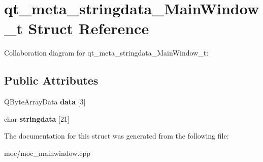 \hypertarget{structqt__meta__stringdata___main_window__t}{\section{qt\-\_\-meta\-\_\-stringdata\-\_\-\-Main\-Window\-\_\-t Struct Reference}
\label{structqt__meta__stringdata___main_window__t}
}


Collaboration diagram for qt\-\_\-meta\-\_\-stringdata\-\_\-\-Main\-Window\-\_\-t\-:
\subsection*{Public Attributes}
\begin{DoxyCompactItemize}
\item 
\hypertarget{structqt__meta__stringdata___main_window__t_a0a55531510dd06148b7b0f445e2b6c59}{Q\-Byte\-Array\-Data {\bfseries data} \mbox{[}3\mbox{]}}\label{structqt__meta__stringdata___main_window__t_a0a55531510dd06148b7b0f445e2b6c59}

\item 
\hypertarget{structqt__meta__stringdata___main_window__t_a22301b390de7f6e6864deb255884e5f9}{char {\bfseries stringdata} \mbox{[}21\mbox{]}}\label{structqt__meta__stringdata___main_window__t_a22301b390de7f6e6864deb255884e5f9}

\end{DoxyCompactItemize}


The documentation for this struct was generated from the following file\-:\begin{DoxyCompactItemize}
\item 
moc/moc\-\_\-mainwindow.\-cpp\end{DoxyCompactItemize}
